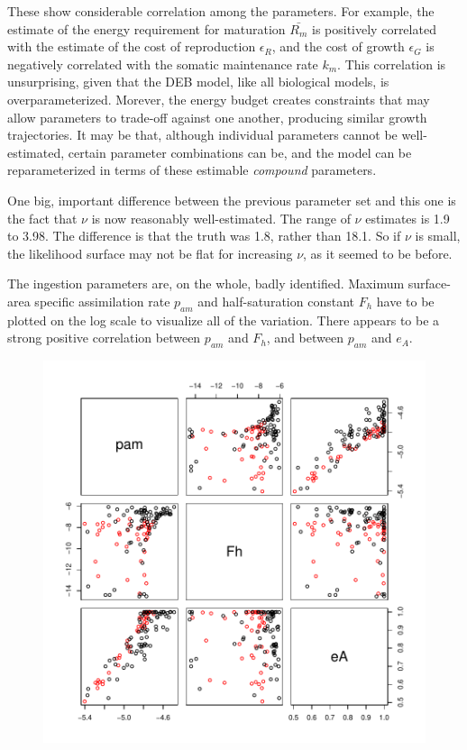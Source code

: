 \documentclass[12pt,reqno,final]{amsart}
\theoremstyle{plain}
\numberwithin{equation}{part}
\begin{document}
These show considerable correlation among the parameters. For example,
the estimate of the energy requirement for maturation $\bar{R_m}$ is
positively correlated with the estimate of the cost of
reproduction $\epsilon_R$, and the cost of growth $\epsilon_G$ is
negatively correlated with the somatic maintenance rate $k_m$. This
correlation is unsurprising, given that the DEB model, like
all biological models, is overparameterized. Morever, the energy
budget creates constraints that may allow parameters to trade-off
against one another, producing similar growth trajectories. It may be
that, although individual parameters cannot be well-estimated, certain
parameter combinations can be, and the model can be reparameterized in
terms of these estimable \emph{compound} parameters.

One big, important difference between the previous parameter set and
this one is the fact that $\nu$ is now reasonably well-estimated. The
range of $\nu$ estimates is 1.9 to 3.98. The difference is that the
truth was 1.8, rather than 18.1. So if $\nu$ is small, the likelihood
surface may not be flat for increasing $\nu$, as it seemed to be
before.

The ingestion parameters are, on the whole, badly identified. Maximum
surface-area specific assimilation rate $p_{am}$ and half-saturation
constant $F_h$ have to be plotted on the log scale to visualize all of
the variation. There appears to be a strong positive correlation
between $p_{am}$ and $F_h$, and between $p_{am}$ and $e_A$.

\begin{figure}
\includegraphics{Solving_the_problem_of_parameter_covariation_2-002}
\end{figure}
\end{document}
